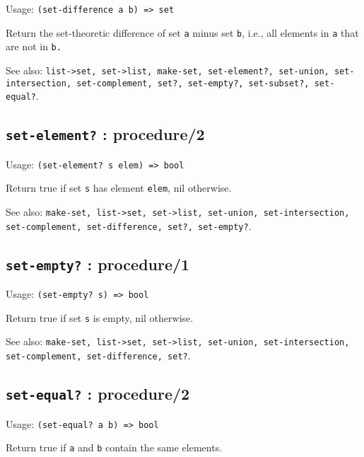 \documentclass[
]{article}
\newcommand{\passthrough}[1]{#1}
\begin{document}
Usage: \passthrough{\lstinline!(set-difference a b) => set!}

Return the set-theoretic difference of set \passthrough{\lstinline!a!}
minus set \passthrough{\lstinline!b!}, i.e., all elements in
\passthrough{\lstinline!a!} that are not in \passthrough{\lstinline!b.!}

See also:
\passthrough{\lstinline!list->set, set->list, make-set, set-element?, set-union, set-intersection, set-complement, set?, set-empty?, set-subset?, set-equal?!}.

\hypertarget{set-element-procedure2-1}{%
\subsection{\texorpdfstring{\texttt{set-element?} :
procedure/2}{set-element? : procedure/2}}\label{set-element-procedure2-1}}

Usage: \passthrough{\lstinline!(set-element? s elem) => bool!}

Return true if set \passthrough{\lstinline!s!} has element
\passthrough{\lstinline!elem!}, nil otherwise.

See also:
\passthrough{\lstinline!make-set, list->set, set->list, set-union, set-intersection, set-complement, set-difference, set?, set-empty?!}.

\hypertarget{set-empty-procedure1-1}{%
\subsection{\texorpdfstring{\texttt{set-empty?} :
procedure/1}{set-empty? : procedure/1}}\label{set-empty-procedure1-1}}

Usage: \passthrough{\lstinline!(set-empty? s) => bool!}

Return true if set \passthrough{\lstinline!s!} is empty, nil otherwise.

See also:
\passthrough{\lstinline!make-set, list->set, set->list, set-union, set-intersection, set-complement, set-difference, set?!}.

\hypertarget{set-equal-procedure2-1}{%
\subsection{\texorpdfstring{\texttt{set-equal?} :
procedure/2}{set-equal? : procedure/2}}\label{set-equal-procedure2-1}}

Usage: \passthrough{\lstinline!(set-equal? a b) => bool!}

Return true if \passthrough{\lstinline!a!} and
\passthrough{\lstinline!b!} contain the same elements.
\end{document}
